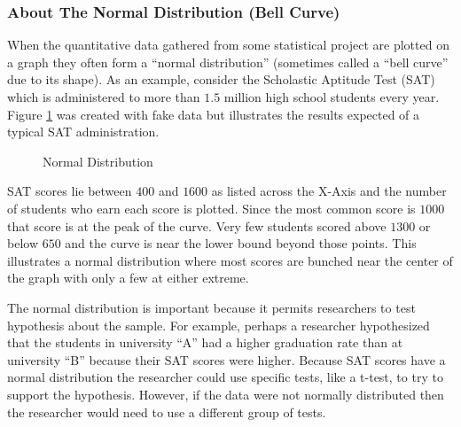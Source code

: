\subsubsection{About The Normal Distribution (Bell Curve)}\label{int:normal_distribution}

When the quantitative data gathered from some statistical project are plotted on a graph they often form a ``normal distribution'' (sometimes called a ``bell curve'' due to its shape). As an example, consider the Scholastic Aptitude Test (SAT) which is administered to more than $ 1.5 $ million high school students every year. Figure \ref{int:normal_dist_figure} was created with fake data but illustrates the results expected of a typical SAT administration.

\begin{figure}[H]
  \begin{center}
    \caption{Normal Distribution}
    \label{int:normal_dist_figure}
  \end{center}
\end{figure}

SAT scores lie between $ 400 $ and $ 1600 $ as listed across the X-Axis and the number of students who earn each score is plotted. Since the most common score is $ 1000 $ that score is at the peak of the curve. Very few students scored above $ 1300 $ or below $ 650 $ and the curve is near the lower bound beyond those points. This illustrates a normal distribution where most scores are bunched near the center of the graph with only a few at either extreme.

The normal distribution is important because it permits researchers to test hypothesis about the sample. For example, perhaps a researcher hypothesized that the students in university ``A'' had a higher graduation rate than at university ``B'' because their SAT scores were higher. Because SAT scores have a normal distribution the researcher could use specific tests, like a t-test, to try to support the hypothesis. However, if the data were not normally distributed then the researcher would need to use a different group of tests.

